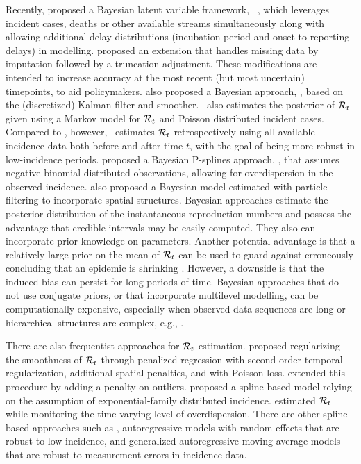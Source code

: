 Recently, \citet{abbott2020estimating} proposed a Bayesian latent
variable framework, \ \citep{EpiNow2}, which leverages incident cases,
deaths or other available streams simultaneously along with allowing additional
delay distributions (incubation period and onset to reporting delays) in
modelling. \citet{lison2024generative} proposed an extension that
handles missing data by imputation followed by a truncation adjustment. These
modifications are intended to increase accuracy at the most recent (but most
uncertain) timepoints, to aid policymakers. \citet{parag2021improved} also proposed a Bayesian approach, \EpiFilter,
based on the (discretized) Kalman filter and smoother. \EpiFilter\ also
estimates the posterior of $\mathcal{R}_t$ given using a Markov model for $\mathcal{R}_t$
and Poisson distributed incident cases. Compared to \EpiEstim, however,
\EpiFilter\ estimates $\mathcal{R}_t$ retrospectively using all available incidence
data both before and after time $t$, with the goal of being more robust in
low-incidence periods. \citet{gressani2022epilps} proposed a
Bayesian P-splines approach, \EpiLPS, that assumes negative binomial distributed
observations, allowing for overdispersion in the observed incidence. \citet{trevisin2023spatially} also proposed a Bayesian model estimated with
particle filtering to incorporate spatial structures. Bayesian approaches
estimate the posterior distribution of the instantaneous reproduction numbers
and possess the advantage that credible intervals may be easily computed. They
also can incorporate prior knowledge on parameters. Another potential advantage
is that a relatively large prior on the mean of $\mathcal{R}_t$ can be used to guard
against erroneously concluding that an epidemic is shrinking
\citep{thompson2019improved}. However, a downside is that the induced bias can
persist for long periods of time. Bayesian approaches that do not use conjugate
priors, or that incorporate multilevel modelling, can be computationally
expensive, especially when observed data sequences are long or hierarchical
structures are complex, e.g., \cite{abbott2020estimating}. 


There are also frequentist approaches for $\mathcal{R}_t$ estimation. \citet{abry2020spatial} proposed regularizing the smoothness of $\mathcal{R}_t$
through penalized regression with second-order temporal regularization,
additional spatial penalties, and with Poisson loss. \citet{pascal2022nonsmooth} extended this procedure by adding a penalty on
outliers. \citet{pircalabelu2023spline} proposed a
spline-based model relying on the assumption of exponential-family distributed
incidence. \citet{ho2023accounting} estimated $\mathcal{R}_t$ while
monitoring the time-varying level of overdispersion. There are other
spline-based approaches such as
\cite{azmon2014estimation,gressani2021approximate}, autoregressive models with
random effects \citep{jin2023epimix} that are robust to low incidence, and
generalized autoregressive moving average models \citep{hettinger2023estimating}
that are robust to measurement errors in incidence data. 


